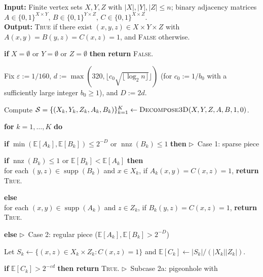 \documentclass[11pt]{article}
\theoremstyle{definition}
\newcommand{\algcomment}[1]{\hfill $\triangleright$~{\small #1}}
\renewcommand{\label}[1]{}%
\newcommand{\E}{\mathbb{E}}
\newcommand{\supp}{\operatorname{supp}}
\newcommand{\nnz}{\operatorname{nnz}}
\newcommand{\abs}[1]{\left\lvert #1 \right\rvert}
\newcommand{\dens}[1]{\E[#1]}
\newcommand{\DecomposeThreeD}{\textnormal{\textsc{Decompose3D}}}
\newcommand{\TriangleDetect}{\textnormal{\textsc{TriangleDetect}}}
\begin{document}
\begin{algorithm}[!htbp]
\caption{$\TriangleDetect(X, Y, Z, A, B, C)$}
\label{alg:triangle}
\small
\textbf{Input:} Finite vertex sets $X, Y, Z$ with $\abs{X}, \abs{Y}, \abs{Z} \le n$; binary adjacency matrices $A \in \{0, 1\}^{X \times Y}$, $B \in \{0, 1\}^{Y \times Z}$, $C \in \{0, 1\}^{X \times Z}$.\\
\textbf{Output:} \textnormal{\textsc{True}} if there exist $(x, y, z) \in X \times Y \times Z$ with $A(x, y) = B(y, z) = C(x, z) = 1$, and \textnormal{\textsc{False}} otherwise.
\begin{algsteps}
    \item \textbf{if} $X = \emptyset$ or $Y = \emptyset$ or $Z = \emptyset$ \textbf{then return} \textnormal{\textsc{False}}. \label{line:tri-empty}
    \item Fix $\varepsilon := 1/160$, $d := \max(320, \lfloor c_0 \sqrt{\lfloor \log_2 n \rfloor} \rfloor)$ (for $c_0 := 1/b_0$ with a sufficiently large integer $b_0 \ge 1$), and $D := 2d$. \label{line:tri-init}
    \item Compute $\mathcal{S} = \{(X_k, Y_k, Z_k, A_k, B_k)\}_{k=1}^K \gets \DecomposeThreeD(X, Y, Z, A, B, 1, 0)$. \label{line:tri-decomp}
    \item \textbf{for} $k = 1, \dots, K$ \textbf{do} \label{line:tri-loop}
    \item \quad \textbf{if} $\min(\dens{A_k}, \dens{B_k}) \le 2^{-D}$ or $\nnz(B_k) \le 1$ \textbf{then} \algcomment{Case 1: sparse piece} \label{line:tri-sparse}
    \item \qquad \textbf{if} $\nnz(B_k) \le 1$ or $\dens{B_k} < \dens{A_k}$ \textbf{then}\\
    \qquad\quad for each $(y, z) \in \supp(B_k)$ and $x \in X_k$, if $A_k(x, y) = C(x, z) = 1$, \textbf{return} \textnormal{\textsc{True}}. \label{line:tri-scanb}
    \item \qquad \textbf{else}\\
    \qquad\quad for each $(x, y) \in \supp(A_k)$ and $z \in Z_k$, if $B_k(y, z) = C(x, z) = 1$, \textbf{return} \textnormal{\textsc{True}}. \label{line:tri-scana}
    \item \quad \textbf{else} \algcomment{Case 2: regular piece ($\dens{A_k}, \dens{B_k} > 2^{-D}$)} \label{line:tri-reg}
    \item \qquad Let $S_k \gets \{(x, z) \in X_k \times Z_k : C(x, z) = 1\}$ and $\dens{C_k} \gets \abs{S_k} / (\abs{X_k}\abs{Z_k})$. \label{line:tri-sk}
    \item \qquad \textbf{if} $\dens{C_k} > 2^{-\varepsilon d}$ \textbf{then return} \textnormal{\textsc{True}}. \algcomment{Subcase 2a: pigeonhole with \Cref{prop:regular-product}} \label{line:tri-pigeon}

\end{algsteps}
\end{algorithm}
\end{document}
